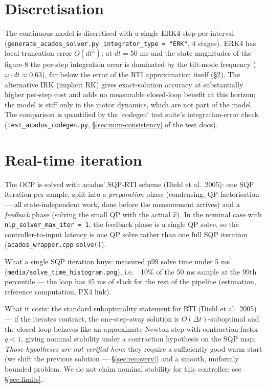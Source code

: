\documentclass[11pt]{article}
\begin{document}
\section{Discretisation}
\label{sec:disc}

The continuous model is discretised with a single ERK4 step per interval
(\texttt{generate\_acados\_solver.py}: \texttt{integrator\_type = "ERK"}, 4 stages).
ERK4 has local truncation error $O(dt^5)$; at $dt = 50$ ms and the state magnitudes of the
figure-8 the per-step integration error is dominated by the tilt-mode frequency
($\omega \cdot dt \approx 0.63$), far below the error of the RTI approximation itself
(\S\ref{sec:rti}). The alternative IRK (implicit RK) gives exact-solution accuracy at
substantially higher per-step cost and adds no measurable closed-loop benefit at this
horizon; the model is stiff only in the motor dynamics, which are not part of the model.
The comparison is quantified by the `codegen` test suite's integration-error check
(\texttt{test\_acados\_codegen.py}, \S\ref{sec:num-consistency} of the test docs).

\section{Real-time iteration}
\label{sec:rti}

The OCP is solved with acados' SQP-RTI scheme (Diehl et al.\ 2005): one SQP iteration per
sample, split into a \emph{preparation} phase (condensing, QP factorisation — all
state-independent work, done before the measurement arrives) and a \emph{feedback} phase
(solving the small QP with the actual $\hat x$). In the nominal case with
\texttt{nlp\_solver\_max\_iter = 1}, the feedback phase is a single QP solve, so the
controller-to-input latency is one QP solve rather than one full SQP iteration
(\texttt{acados\_wrapper.cpp} \texttt{solve()}).

What a single SQP iteration buys: measured p99 solve time under 5 ms
(\texttt{media/solve\_time\_histogram.png}), i.e.\ ~10\% of the 50 ms sample at the 99th
percentile — the loop has 45 ms of slack for the rest of the pipeline (estimation,
reference computation, PX4 link).

What it costs: the standard suboptimality statement for RTI (Diehl et al.\ 2005) — if the
iterates contract, the one-step-away solution is $O(\Delta t)$-suboptimal and the closed
loop behaves like an approximate Newton step with contraction factor $q < 1$, giving
nominal stability under a contraction hypothesis on the SQP map. \emph{Those hypotheses are
not verified here}: they require a sufficiently good warm start (we shift the previous
solution — \S\ref{sec:recovery}) and a smooth, uniformly bounded problem. We do not claim
nominal stability for this controller; see \S\ref{sec:limits}.
\end{document}
